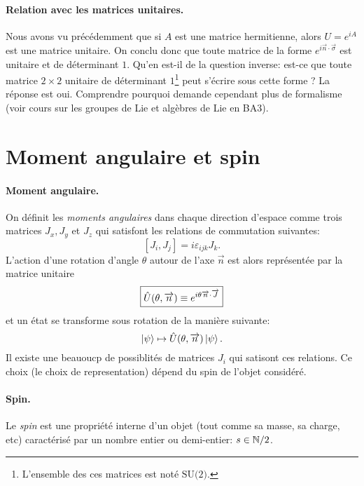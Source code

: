 \documentclass[11pt,a4paper,oneside]{article}
\begin{document}
\paragraph*{Relation avec les matrices unitaires.} Nous avons vu précédemment que si $A$ est une matrice hermitienne, alors $U=e^{iA}$ est une matrice unitaire. On conclu donc que toute matrice de la forme $e^{i\vec{n}\cdot\vec{\sigma}}$ est unitaire et de déterminant $1$. Qu'en est-il de la question inverse: est-ce que toute matrice $2\times2$ unitaire de déterminant $1$\footnote{L'ensemble des ces matrices est noté $\text{SU(2)}$.} peut s'écrire sous cette forme ? La réponse est oui. Comprendre pourquoi demande cependant plus de formalisme (voir cours sur les groupes de Lie et algèbres de Lie en BA3).

\section{Moment angulaire et spin}

\paragraph*{Moment angulaire.} On définit les \emph{moments angulaires} dans chaque direction d'espace comme trois matrices $J_x,J_y$ et $J_z$ qui satisfont les relations de commutation suivantes:
\begin{equation}
    \boxed{[J_i,J_j] = i\varepsilon_{ijk}J_k}.
\end{equation}
L'action d'une rotation d'angle $\theta$ autour de l'axe $\vec{n}$ est alors représentée par la matrice unitaire
\begin{equation}
    \boxed{\hat{U}(\theta,\overrightarrow{n})\equiv e^{i\theta\overrightarrow{n}\cdot\overrightarrow{J}}}
\end{equation}
et un état se transforme sous rotation de la manière suivante:
\begin{equation}
    \ket{\psi}\mapsto \hat{U}(\theta,\overrightarrow{n})\ket{\psi}.
\end{equation}
Il existe une beauoucp de possiblités de matrices $J_i$ qui satisont ces relations. Ce choix (le choix de representation) dépend du spin de l'objet considéré.

\paragraph*{Spin.} Le \emph{spin} est une propriété interne d'un objet (tout comme sa masse, sa charge, etc) caractérisé par un nombre entier ou demi-entier: $s\in \mathbb{N}/2$. \\
\end{document}
